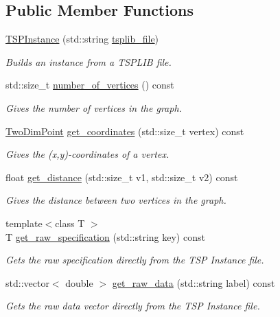 \subsection*{Public Member Functions}
\begin{DoxyCompactItemize}
\item 
\hyperlink{classas_1_1tsplib_1_1TSPInstance_a5cc9de2e917ae7aa608e10b4375155d6}{T\+S\+P\+Instance} (std\+::string \hyperlink{classas_1_1tsplib_1_1TSPInstance_a6b2d4d7ad5e12825ceee49d32cdc28af}{tsplib\+\_\+file})
\begin{DoxyCompactList}\small\item\em Builds an instance from a T\+S\+P\+L\+IB file. \end{DoxyCompactList}\item 
std\+::size\+\_\+t \hyperlink{classas_1_1tsplib_1_1TSPInstance_a3beae0a769669c417e8bc7d1e41a7550}{number\+\_\+of\+\_\+vertices} () const
\begin{DoxyCompactList}\small\item\em Gives the number of vertices in the graph. \end{DoxyCompactList}\item 
\hyperlink{structas_1_1TwoDimPoint}{Two\+Dim\+Point} \hyperlink{classas_1_1tsplib_1_1TSPInstance_a36962fb85e309faa3efb28fae3b2956b}{get\+\_\+coordinates} (std\+::size\+\_\+t vertex) const
\begin{DoxyCompactList}\small\item\em Gives the (x,y)-\/coordinates of a vertex. \end{DoxyCompactList}\item 
float \hyperlink{classas_1_1tsplib_1_1TSPInstance_a52535b9ad72eaaac80f2a7a1518e680f}{get\+\_\+distance} (std\+::size\+\_\+t v1, std\+::size\+\_\+t v2) const
\begin{DoxyCompactList}\small\item\em Gives the distance between two vertices in the graph. \end{DoxyCompactList}\item 
{\footnotesize template$<$class T $>$ }\\T \hyperlink{classas_1_1tsplib_1_1TSPInstance_a24f6eeee5dba6517265a9211da0b4962}{get\+\_\+raw\+\_\+specification} (std\+::string key) const
\begin{DoxyCompactList}\small\item\em Gets the raw specification directly from the T\+SP Instance file. \end{DoxyCompactList}\item 
std\+::vector$<$ double $>$ \hyperlink{classas_1_1tsplib_1_1TSPInstance_a9104ddf703ed589337edfbd44d7ffdf6}{get\+\_\+raw\+\_\+data} (std\+::string label) const
\begin{DoxyCompactList}\small\item\em Gets the raw data vector directly from the T\+SP Instance file. \end{DoxyCompactList}\end{DoxyCompactItemize}
